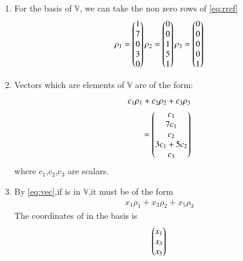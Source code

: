 \documentclass[journal,12pt,twocolumn]{IEEEtran}
\begin{document}
\begin{enumerate}[label=\alph*.]
\item For the basis of $\mathbb{V}$, we can take the non zero rows of \eqref{eq:rref} \\
\begin{align}
    \rho_1=\begin{pmatrix}1\\7\\0\\3\\0\end{pmatrix} 
    \rho_2=\begin{pmatrix}0\\0\\1\\5\\1\end{pmatrix}
    \rho_3=\begin{pmatrix}0\\0\\0\\0\\1\end{pmatrix}
\end{align}
\item Vectors which are elements of $\mathbb{V}$  are of the form:
\begin{align}
    c_1\rho_1+c_2\rho_2+c_3\rho_3 \nonumber\\
    =\begin{pmatrix}c_1\\7c_1\\c_2\\3c_1+5c_2\\c_3\end{pmatrix} \label{eq:vec}
\end{align}
where $c_1$,$c_2$,$c_3$ are scalars.
\item By \eqref{eq:vec},if  is in $\mathbb{V}$,it must be of the form
\begin{align}
    x_1\rho_1+x_3\rho_2+x_5\rho_3
\end{align}
The coordinates of  in the  basis is
\begin{align}
    \begin{pmatrix}x_1\\x_3\\x_5\end{pmatrix}
\end{align}
\end{enumerate}
\end{document}
